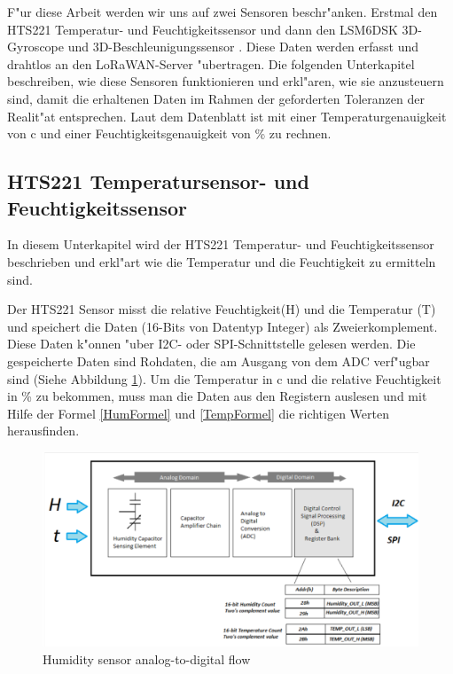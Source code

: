 F"ur diese Arbeit werden wir uns auf zwei Sensoren beschr"anken. 
Erstmal den HTS221\cite{HTS221} Temperatur- und Feuchtigkeitssensor 
und dann den LSM6DSK 3D-Gyroscope und 3D-Beschleunigungssensor 
\cite{LSM6DSL}. Diese Daten werden erfasst und drahtlos an den 
LoRaWAN-Server "ubertragen. Die folgenden Unterkapitel beschreiben, 
wie diese Sensoren funktionieren und erkl"aren, wie sie anzusteuern 
sind, damit die erhaltenen Daten im Rahmen der geforderten Toleranzen 
der Realit"at entsprechen. Laut dem Datenblatt ist mit einer 
Temperaturgenauigkeit von \textdegree{}c und einer 
Feuchtigkeitsgenauigkeit von \%   zu rechnen. 

\subsection {HTS221 Temperatursensor- und Feuchtigkeitssensor}\label{Temp}
In diesem Unterkapitel wird der HTS221 Temperatur- und 
Feuchtigkeitssensor beschrieben und erkl"art wie die Temperatur und 
die Feuchtigkeit zu ermitteln sind.

Der HTS221 Sensor misst die relative Feuchtigkeit(H) und die 
Temperatur (T) und speichert die Daten (16-Bits von Datentyp Integer) 
als Zweierkomplement. Diese Daten k"onnen "uber I2C- oder 
SPI-Schnittstelle gelesen werden. Die gespeicherte Daten sind 
Rohdaten, die am Ausgang von dem \ac{ADC} verf"ugbar sind (Siehe 
Abbildung \ref{HT_sensor}). Um die Temperatur in \textdegree{}c und 
die relative Feuchtigkeit in \% zu bekommen, muss man die Daten aus 
den Registern auslesen und mit Hilfe der Formel \ref{HumFormel} und 
\ref{TempFormel} die richtigen Werten herausfinden.

\begin{figure}[h]
	\centering
	\includegraphics[width=14cm]{source/images/HTS221_sensor}
	\caption{Humidity sensor analog-to-digital flow 
	\cite{HTS221}}\label{HT_sensor}
\end{figure}

